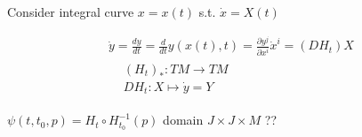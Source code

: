 \documentclass[11pt]{amsart}
\theoremstyle{definition}
\begin{document}
Consider integral curve $x = x(t)$ s.t. $\dot{x} = X(t)$

\[
\begin{gathered}
  \dot{y} = \frac{dy}{dt} = \frac{d}{dt} y(x(t),t) = \frac{ \partial y^j}{ \partial x^i }\dot{x}^i = (DH_t)X \\
\begin{aligned}
  & (H_t)_* : TM \to TM \\
  & DH_t : X \mapsto \dot{y} = Y
\end{aligned}
\end{gathered}
\]



$\psi(t,t_0,p) = H_t \circ H_{t_0}^{-1}(p)$ domain $J \times J \times M$ ??
\end{document}
